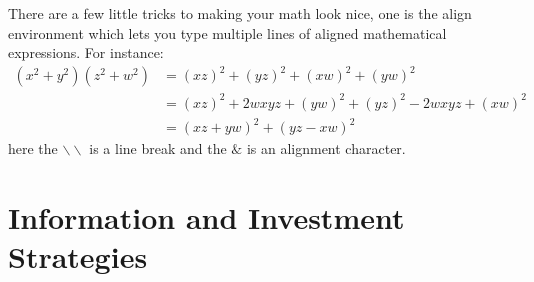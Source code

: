 \documentclass[12pt]{article}
\begin{document}
There are a few little tricks to making your math look nice, one is the align environment which lets you type multiple lines of aligned mathematical expressions. For instance:
\begin{align*}
(x^2+y^2)(z^2+w^2) & = (xz)^2 + (yz)^2 + (xw)^2 + (yw)^2 \\
& =  (xz)^2 + 2wxyz + (yw)^2 + (yz)^2 - 2 wxyz + (xw)^2 \\
&= (xz+yw)^2 + (yz-xw)^2
\end{align*}
here the $\backslash\backslash$ is a line break and the $\&$ is an alignment character. 
\section{Information and Investment Strategies}


 


 
\end{document}

